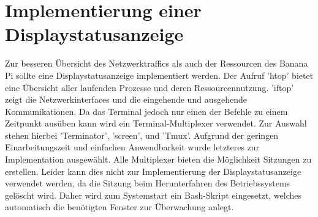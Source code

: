 \section{Implementierung einer Displaystatusanzeige}
Zur besseren Übersicht des Netzwerktraffics als auch der Ressourcen des Banana Pi sollte eine Displaystatusanzeige implementiert werden. Der Aufruf 'htop' bietet eine Übersicht aller laufenden Prozesse und deren Ressourcennutzung. 'iftop' zeigt die Netzwerkinterfaces und die eingehende und ausgehende Kommunikationen. Da das Terminal jedoch nur einen der Befehle zu einem Zeitpunkt ausüben kann wird ein Terminal-Multiplexer verwendet. Zur Auswahl stehen hierbei 'Terminator', 'screen', und 'Tmux'. Aufgrund der geringen Einarbeitungszeit und einfachen Anwendbarkeit wurde letzteres zur Implementation ausgewählt. Alle Multiplexer bieten die Möglichkeit Sitzungen zu erstellen. Leider kann dies nicht zur Implementierung der Displaystatusanzeige verwendet werden, da die Sitzung beim Herunterfahren des Betriebssystems gelöscht wird. Daher wird zum Systemstart ein Bash-Skript eingesetzt, welches automatisch die benötigten Fenster zur Überwachung anlegt.
